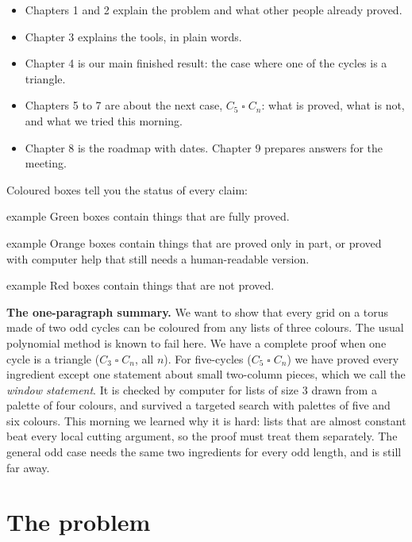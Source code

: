 \documentclass[11pt,oneside,openany]{book}
\newcommand{\T}{\mathbin{\square}}
\begin{document}
\begin{itemize}[itemsep=0.3em]
\item Chapters 1 and 2 explain the problem and what other people already proved.
\item Chapter 3 explains the tools, in plain words.
\item Chapter 4 is our main finished result: the case where one of the cycles is a triangle.
\item Chapters 5 to 7 are about the next case, $C_5 \T C_n$: what is proved, what is not, and
what we tried this morning.
\item Chapter 8 is the roadmap with dates. Chapter 9 prepares answers for the meeting.
\end{itemize}

Coloured boxes tell you the status of every claim:

\begin{proved}{example}
Green boxes contain things that are fully proved.
\end{proved}
\begin{partialbox}{example}
Orange boxes contain things that are proved only in part, or proved with computer help that
still needs a human-readable version.
\end{partialbox}
\begin{openitem}{example}
Red boxes contain things that are not proved.
\end{openitem}

\begin{meeting}
\textbf{The one-paragraph summary.} We want to show that every grid on a torus made of two odd
cycles can be coloured from any lists of three colours. The usual polynomial method is known to
fail here. We have a complete proof when one cycle is a triangle ($C_3 \T C_n$, all $n$). For
five-cycles ($C_5 \T C_n$) we have proved every ingredient except one statement about small
two-column pieces, which we call the \emph{window statement}. It is checked by computer for
lists of size 3 drawn from a palette of four colours, and survived a targeted search with palettes of five and six colours. This
morning we learned why it is hard: lists that are almost constant beat every local cutting
argument, so the proof must treat them separately. The general odd case needs the same two
ingredients for every odd length, and is still far away.
\end{meeting}

\chapter{The problem}
\end{document}
